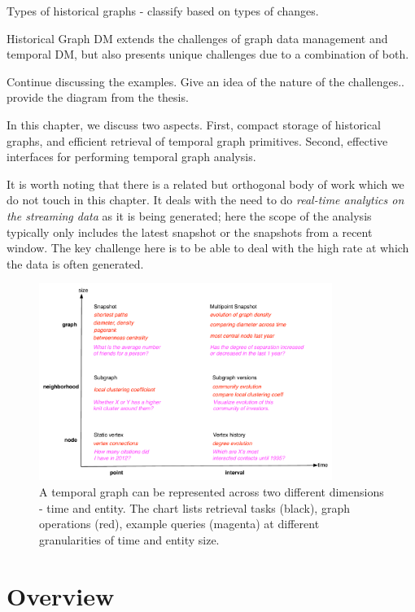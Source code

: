 \documentclass{svjour3}
\begin{document}
Types of historical graphs - classify based on types of changes.


Historical Graph DM extends the challenges of graph data management and temporal DM, but also presents unique challenges due to a combination of both.

Continue discussing the examples. Give an idea of the nature of the challenges.. provide the diagram from the thesis.

In this chapter, we discuss two aspects. First, compact storage of historical graphs, and efficient retrieval of temporal graph primitives. Second, effective interfaces for performing temporal graph analysis.

It is worth noting that there is a related but orthogonal body of work which we do not touch in this chapter. It deals with the need to do {\em real-time analytics on the streaming data} as it is being generated; here the scope of the analysis typically only includes the latest snapshot or the snapshots from a recent window. The key challenge here is to be able to deal with the high rate at which the data is often generated.

\begin{figure}
\centering
\includegraphics [width=0.85\textwidth]{entity-time.pdf}
\caption{A temporal graph can be represented across two different dimensions - time
and entity. The chart lists retrieval tasks (black), graph operations (red), example queries
(magenta) at different granularities of time and entity size.}
\label{fig:et}
\end{figure}

\section{Overview}
\end{document}
